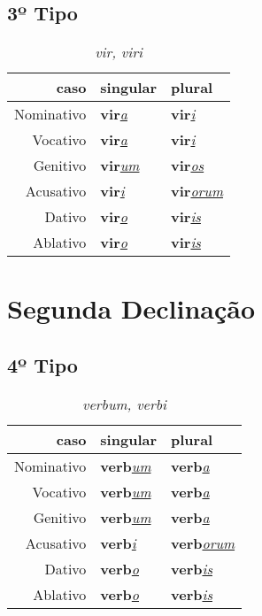 \documentclass{article}
\newcommand{\radicaldesinencia}[2]{\textbf{#1}\textit{\underline{#2}}}
\begin{document}
\subsection*{3º Tipo}
\begin{table}[H]
\centering
\caption*{\textit{vir, viri}}
\vspace{0.2cm}
\begin{tabular}{r|l|l}
\hline
caso			&	singular					& plural 						\\
\hline                                    		
\hline
Nominativo	&	\radicaldesinencia{vir}{a}	& \radicaldesinencia{vir}{i}	\\
Vocativo		&	\radicaldesinencia{vir}{a}	& \radicaldesinencia{vir}{i}	\\
Genitivo		&	\radicaldesinencia{vir}{um}	& \radicaldesinencia{vir}{os}	\\
Acusativo	&	\radicaldesinencia{vir}{i}	& \radicaldesinencia{vir}{orum}	\\
Dativo		&	\radicaldesinencia{vir}{o}	& \radicaldesinencia{vir}{is}		\\
Ablativo		&	\radicaldesinencia{vir}{o}	& \radicaldesinencia{vir}{is}		\\


 \hline
\end{tabular}
\end{table}
\clearpage





\section*{Segunda Declinação}
\subsection*{4º Tipo}
\begin{table}[H]
\centering
\caption*{\textit{verbum, verbi}}
\vspace{0.2cm}
\begin{tabular}{r|l|l}
\hline
caso			&	singular					& plural 						\\
\hline                                    		
\hline
Nominativo	&	\radicaldesinencia{verb}{um}	& \radicaldesinencia{verb}{a}		\\
Vocativo		&	\radicaldesinencia{verb}{um}	& \radicaldesinencia{verb}{a}		\\
Genitivo		&	\radicaldesinencia{verb}{um}	& \radicaldesinencia{verb}{a}		\\
Acusativo	&	\radicaldesinencia{verb}{i}		& \radicaldesinencia{verb}{orum}		\\
Dativo		&	\radicaldesinencia{verb}{o}		& \radicaldesinencia{verb}{is}		\\
Ablativo		&	\radicaldesinencia{verb}{o}		& \radicaldesinencia{verb}{is}		\\


 \hline
\end{tabular}
\end{table}
\clearpage
\end{document}
